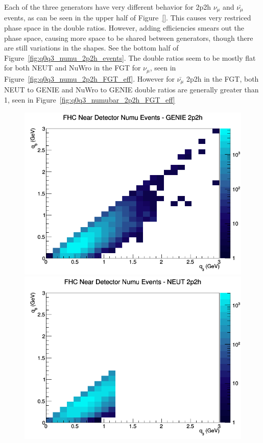 \documentclass[12pt]{article}
\begin{document}
\FloatBarrier
Each of the three generators have very different behavior for 2p2h $\nu_\mu$ and $\bar{\nu_{\mu}}$ events, as can be seen in the upper half of Figure~\ref{}. This causes very restriced phase space in the double ratios. However, adding efficiencies smears out the phase space, causing more space to be shared between generators, though there are still variations in the shapes. See the bottom half of Figure~\ref{fig:q0q3_numu_2p2h_events}. The double ratios seem to be mostly flat for both NEUT and NuWro in the FGT for $\nu_{\mu}$, seen in Figure~\ref{fig:q0q3_numu_2p2h_FGT_eff}. However for $\bar{\nu_{\mu}}$ 2p2h in the FGT, both NEUT to GENIE and NuWro to GENIE double ratios are generally greater than 1, seen in Figure~\ref{fig:q0q3_numubar_2p2h_FGT_eff}
\begin{figure}[h]
\centering
{}
\includegraphics[width=\linewidth]{q0_q3/nominal/2p2h_FHC_ND_numu_q3_q0_GENIE.png}
\endminipage
{}
\includegraphics[width=\linewidth]{q0_q3/nominal/2p2h_FHC_ND_numu_q3_q0_NEUT.png}

\end{figure}
\end{document}
